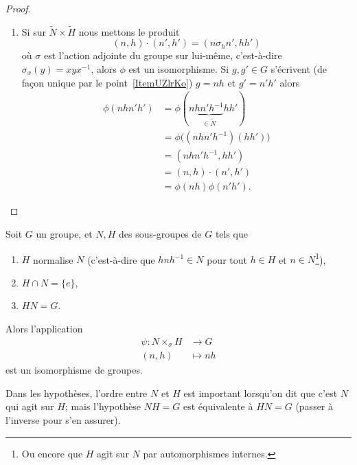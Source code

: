 \begin{proof}
\begin{enumerate}
		\item
		      Si sur \( \tilde N\times \tilde H\) nous mettons le produit
		      \begin{equation}
			      (n,h)\cdot(n',h')=(n\sigma_hn',hh')
		      \end{equation}
		      où \( \sigma\) est l'action adjointe du groupe sur lui-même, c'est-à-dire \( \sigma_x(y)=xyx^{-1}\), alors \( \phi\) est un isomorphisme. Si \( g,g'\in G\) s'écrivent (de façon unique par le point~\ref{ItemUZlrKo}) \( g=nh\) et \( g'=n'h'\) alors
		      \begin{subequations}
			      \begin{align}
				      \phi(nhn'h') & =\phi(n\underbrace{hn'h^{-1}}_{\in \tilde N}hh') \\
				                   & =\phi\big( (nhn'h^{-1})(hh') \big)               \\
				                   & =(nhn'h^{-1},hh')                                \\
				                   & =(n,h)\cdot(n',h')                               \\
				                   & =\phi(nh)\phi(n'h').
			      \end{align}
		      \end{subequations}
	\end{enumerate}
\end{proof}

\begin{corollary}\label{CoroGohOZ}
	Soit \( G\) un groupe, et \( N,H\) des sous-groupes de \( G\) tels que
	\begin{enumerate}
		\item
		      \( H\) normalise \( N\) (c'est-à-dire que \( hnh^{-1}\in N\) pour tout \( h\in H\) et \( n\in N\)\footnote{Ou encore que \( H\) agit sur \( N\) par automorphismes internes.}),
		\item
		      \( H\cap N=\{ e \}\),
		\item
		      \( HN=G\).
	\end{enumerate}
	Alors l'application
	\begin{equation}
		\begin{aligned}
			\psi\colon N\times_{\sigma}H & \to G      \\
			(n,h)                        & \mapsto nh
		\end{aligned}
	\end{equation}
	est un isomorphisme de groupes.
\end{corollary}
Dans les hypothèses, l'ordre entre \( N\) et \( H\) est important lorsqu'on dit que c'est \( N\) qui agit sur \( H\); mais l'hypothèse \( NH=G\) est équivalente à \( HN=G\) (passer à l'inverse pour s'en assurer).

